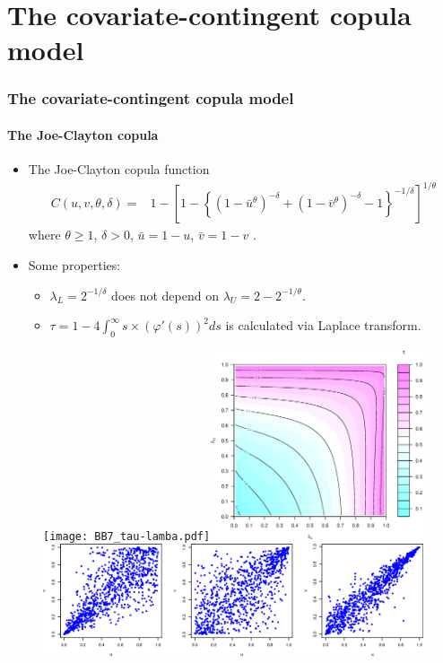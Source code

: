 \documentclass{beamer}
\begin{document}
\section{The covariate-contingent copula model}
\begin{frame}
  \frametitle{The covariate-contingent copula model}
  \framesubtitle{The Joe-Clayton copula}
  \begin{itemize}
  \item The Joe-Clayton copula function
    \[
    \begin{split}
      C(u,v,\theta,\delta)=&1-\left[1-\left\{\left(1-\bar u ^{\theta }\right)^{-\delta
          }+\left(1-\bar v ^{\theta }\right)^{-\delta }-1\right\}^{-1/\delta
        }\right]^{1/\theta }
    \end{split}
    \]
    where $\theta \geq 1$, $\delta > 0$, $\bar u = 1-u$, $\bar v = 1-v$ .

  \item Some properties:
    \begin{itemize}
    \item $\lambda_L=2^{-1/\delta}$ does not depend on $\lambda_U=2-2^{-1/\theta}$.
    \item  $\tau=1- 4\int _0^{\infty} s\times(\varphi'(s))^2ds$ is calculated via Laplace transform.
    \end{itemize}
  \end{itemize}

\end{frame}

\begin{frame}[plain]
  \begin{figure}
    \centering
    \vspace{-0.35cm}
    \texttt{[image: BB7\_tau-lamba.pdf]}\includegraphics[width=0.56\textwidth]{tau-contour}\\
    \includegraphics[width=\textwidth]{BB7Scatter.eps}
  \end{figure}
\end{frame}
\end{document}
